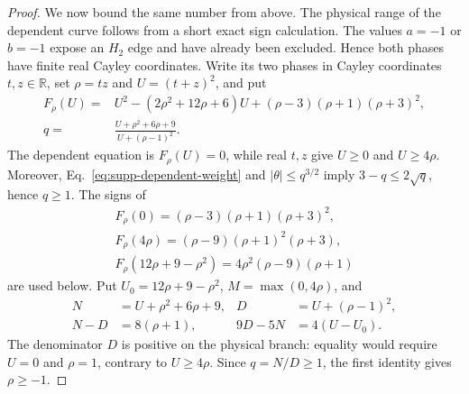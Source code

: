 \begin{proof}
We now bound the same number from above.  The physical range of the dependent curve follows from a short exact sign calculation.  {The values $a=-1$ or $b=-1$ expose an $H_2$ edge and have already been excluded. Hence both phases have finite real Cayley coordinates.} Write its two phases in Cayley coordinates $t,z\in\mathbb R$, set $\rho=tz$ and $U=(t+z)^2$, and put
\begin{equation}
\begin{aligned}
F_\rho(U)={}&U^2-(2\rho^2+12\rho+6)U
 +(\rho-3)(\rho+1)(\rho+3)^2,\\
q={}&\frac{U+\rho^2+6\rho+9}{U+(\rho-1)^2}.
\end{aligned}
\label{eq:supp-dependent-cayley}
\end{equation}
The dependent equation is $F_\rho(U)=0$, while real $t,z$ give $U\geq0$ and $U\geq4\rho$.  Moreover, Eq.~\eqref{eq:supp-dependent-weight} and $|\theta|\le q^{3/2}$ imply $3-q\le2\sqrt q$, hence $q\ge1$. The signs of
\begin{equation}
\begin{gathered}
F_\rho(0)=(\rho-3)(\rho+1)(\rho+3)^2,\\
F_\rho(4\rho)=(\rho-9)(\rho+1)^2(\rho+3),\\
F_\rho(12\rho+9-\rho^2)=4\rho^2(\rho-9)(\rho+1)
\end{gathered}
\label{eq:supp-dependent-sign-table}
\end{equation}
are used below. Put $U_0=12\rho+9-\rho^2$, $M=\max(0,4\rho)$, and
\begin{equation}
\begin{aligned}
N&=U+\rho^2+6\rho+9,&
D&=U+(\rho-1)^2,\\
N-D&=8(\rho+1),&
9D-5N&=4(U-U_0).
\end{aligned}
\label{eq:supp-dependent-range-identities}
\end{equation}
The denominator $D$ is positive on the physical branch: equality would require $U=0$ and $\rho=1$, contrary to $U\ge4\rho$. Since $q=N/D\ge1$, the first identity gives $\rho\ge-1$.


\end{proof}
